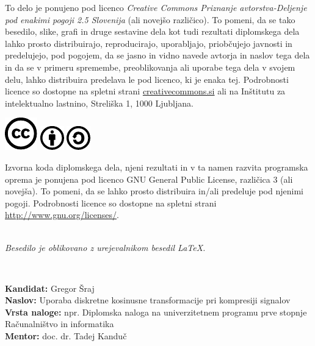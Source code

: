 \documentclass[a4paper,12pt,openright]{book}
\newcommand{\clearemptydoublepage}{\newpage{\pagestyle{empty}\cleardoublepage}}
\newcommand{\CcImageCc}[1]{%
	\includegraphics[scale=#1]{slike/cc_cc_30.pdf}%
}
\newcommand{\CcImageBy}[1]{%
	\includegraphics[scale=#1]{slike/cc_by_30.pdf}%
}
\newcommand{\CcImageSa}[1]{%
	\includegraphics[scale=#1]{slike/cc_sa_30.pdf}%
}
\begin{document}
\newpage
\thispagestyle{empty}

\vspace*{5cm}
{\small \noindent
To delo je ponujeno pod licenco \textit{Creative Commons Priznanje avtorstva-Deljenje pod enakimi pogoji 2.5 Slovenija} (ali novej\v so razli\v cico).
To pomeni, da se tako besedilo, slike, grafi in druge sestavine dela kot tudi rezultati diplomskega dela lahko prosto distribuirajo,
reproducirajo, uporabljajo, priobčujejo javnosti in predelujejo, pod pogojem, da se jasno in vidno navede avtorja in naslov tega
dela in da se v primeru spremembe, preoblikovanja ali uporabe tega dela v svojem delu, lahko distribuira predelava le pod
licenco, ki je enaka tej.
Podrobnosti licence so dostopne na spletni strani \href{http://creativecommons.si}{creativecommons.si} ali na Inštitutu za
intelektualno lastnino, Streliška 1, 1000 Ljubljana.

\vspace*{1cm}
\begin{center}%
\CcImageCc{0.741573033707865}\hspace*{1ex}\CcImageBy{1}\hspace*{1ex}\CcImageSa{1}%
\end{center}
}

\vspace*{1cm}
{\small \noindent
Izvorna koda diplomskega dela, njeni rezultati in v ta namen razvita programska oprema je ponujena pod licenco GNU General Public License,
različica 3 (ali novejša). To pomeni, da se lahko prosto distribuira in/ali predeluje pod njenimi pogoji.
Podrobnosti licence so dostopne na spletni strani \url{http://www.gnu.org/licenses/}.
}

\vfill
\begin{center} 
\ \\ \vfill
{\em
Besedilo je oblikovano z urejevalnikom besedil \LaTeX.}
\end{center}

\clearemptydoublepage

\thispagestyle{empty}
\
\vfill

\bigskip
\noindent\textbf{Kandidat:} Gregor Šraj\\
\noindent\textbf{Naslov:} Uporaba diskretne kosinusne transformacije pri kompresiji signalov\\
\noindent\textbf{Vrsta naloge:} npr. Diplomska naloga na univerzitetnem programu prve stopnje Računalništvo in informatika \\
\noindent\textbf{Mentor:} doc. dr. Tadej Kanduč\\
\end{document}

